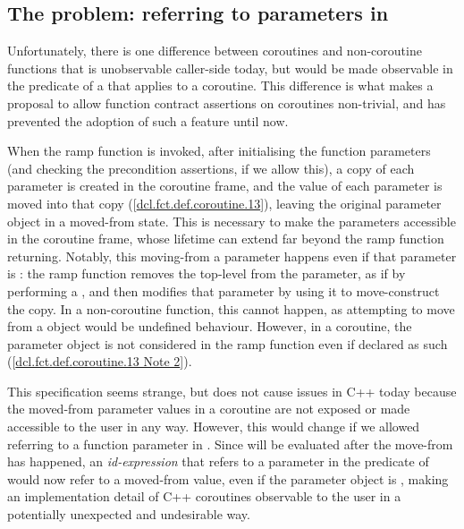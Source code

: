 \subsection{The problem: referring to parameters in }
\label{paramsinpost}

Unfortunately, there is one difference between coroutines and non-coroutine functions that is unobservable caller-side today, but would be made observable in the predicate of a  that applies to a coroutine. This difference is what makes a proposal to allow function contract assertions on coroutines non-trivial, and has prevented the adoption of such a feature until now.

When the ramp function is invoked, after initialising the function parameters (and checking the precondition assertions, if we allow this), a copy of each parameter is created in the coroutine frame, and the value of each parameter is moved into that copy ([\href{https://eel.is/c++draft/dcl.fct.def.coroutine#13}{dcl.fct.def.coroutine.13}]), leaving the original parameter object in a moved-from state. This is necessary to make the parameters accessible in the coroutine frame, whose lifetime can extend far beyond the ramp function returning. Notably, this moving-from a parameter happens even if that parameter is : the ramp function removes the top-level  from the parameter, as if by performing a , and then modifies that parameter by using it to move-construct the copy. In a non-coroutine function, this cannot happen, as attempting to move from a  object would be undefined behaviour. However, in a coroutine, the parameter object is not considered  in the ramp function even if declared as such ([\href{https://eel.is/c++draft/dcl.fct.def.coroutine#note-2}{dcl.fct.def.coroutine.13 Note 2}]).

This specification seems strange, but does not cause issues in C++ today because the moved-from parameter values in a coroutine are not exposed or made accessible to the user in any way. However, this would change if we allowed referring to a function parameter in . Since  will be evaluated after the move-from has happened, an \emph{id-expression} that refers to a parameter in the predicate of  would now refer to a moved-from value, even if the parameter object is , making an implementation detail of C++ coroutines observable to the user in a potentially unexpected and undesirable way.

